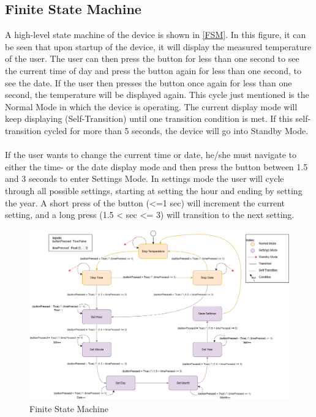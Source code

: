 \subsection{Finite State Machine}
A high-level state machine of the device is shown in \autoref{FSM}. In this figure, it can be seen that upon startup of the device, it will display the measured temperature of the user. The user can then press the button for less than one second to see the current time of day and press the button again for less than one second, to see the date. If the user then presses the button once again for less than one second, the temperature will be displayed again. This cycle just mentioned is the Normal Mode in which the device is operating. The current display mode will keep displaying (Self-Transition) until one transition condition is met. If this self-transition cycled for more than 5 seconds, the device will go into Standby Mode.
\\
\\
If the user wants to change the current time or date, he/she must navigate to either the time- or the date display mode and then press the button between 1.5 and 3 seconds to enter Settings Mode. In settings mode the user will cycle through all possible settings, starting at setting the hour and ending by setting the year. A short press of the button (<=1 sec) will increment the current setting, and a long press (1.5 < sec <= 3) will transition to the next setting.
\begin{figure}[H]
	\centering
	\includegraphics[scale=0.4]{img/FSM.png}
	\caption{Finite State Machine}
	\label{FSM}
\end{figure}

